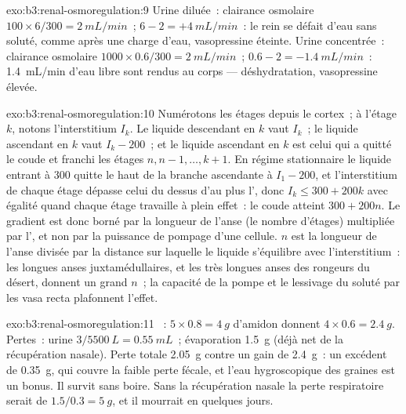 \begin{solution}{exo:b3:renal-osmoregulation:9}
Urine diluée~: clairance osmolaire $100\times 6/300 = \qty{2}{mL/min}$~;
 $6 - 2 = +\qty{4}{mL/min}$~: le rein se défait
d'eau sans soluté, comme après une charge d'eau, vasopressine éteinte.
Urine concentrée~: clairance osmolaire $1000\times 0.6/300 =
\qty{2}{mL/min}$~;  $0.6 - 2 = -\qty{1.4}{mL/min}$~:
\qty{1.4}{mL/min} d'eau libre sont rendus au corps --- déshydratation,
vasopressine élevée.
\end{solution}

\begin{solution}{exo:b3:renal-osmoregulation:10}
Numérotons les étages depuis le cortex~; à l'étage $k$, notons
l'interstitium $I_{k}$. Le liquide descendant en $k$ vaut $I_{k}$~; le liquide
ascendant en $k$ vaut $I_{k} - 200$~; et le liquide ascendant en $k$ est
celui qui a quitté le coude et franchi les étages $n, n-1, \dots, k+1$.
En régime stationnaire le liquide entrant à \qty{300}{} quitte le haut
de la branche ascendante à $I_{1} - 200$, et l'interstitium de chaque
étage dépasse celui du dessus d'au plus l', donc
$I_{k} \le 300 + 200k$ avec égalité quand chaque étage travaille à plein
effet~: le coude atteint $300 + 200n$. Le gradient est donc borné par la
longueur de l'anse (le nombre d'étages) multipliée par l',
et non par la puissance de pompage d'une cellule. $n$ est la longueur de
l'anse divisée par la distance sur laquelle le liquide s'équilibre avec
l'interstitium~: les longues anses juxtamédullaires, et les très longues
anses des rongeurs du désert, donnent un grand $n$~; la capacité de la
pompe et le lessivage du soluté par les vasa recta plafonnent l'effet.
\end{solution}

\begin{solution}{exo:b3:renal-osmoregulation:11}
~: $5\times 0.8 = \qty{4}{g}$ d'amidon donnent $4\times 0.6
= \qty{2.4}{g}$. Pertes~: urine $3/5500\ \unit{L} = \qty{0.55}{mL}$~;
évaporation \qty{1.5}{g} (déjà net de la récupération nasale). Perte
totale \qty{2.05}{g} contre un gain de \qty{2.4}{g}~: un excédent de
\qty{0.35}{g}, qui couvre la faible perte fécale, et l'eau hygroscopique
des graines est un bonus. Il survit sans boire. Sans la récupération
nasale la perte respiratoire serait de $1.5/0.3 = \qty{5}{g}$, et il
mourrait en quelques jours.
\end{solution}


